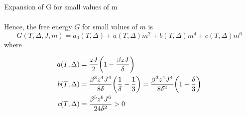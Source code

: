 \documentclass[../main/main.tex]{subfiles}
\begin{document}
\begin{exercise}{Expansion of G for small values of m }{}
\begin{solution}
\begin{equation*}
\begin{split}
\end{split}
\end{equation*}
Hence, the free energy \(G\) for small values of \(m\) is 
\begin{equation*}
  G (T, \Delta , J, m) = a_0 (T,\Delta ) + a(T, \Delta )m^2 + b (T, \Delta ) m^4 + c(T, \Delta )m^6
\end{equation*}
where
\begin{subequations*}
\begin{align*}
  a(T,\Delta ) &= \frac{z J}{2} \qty(1 - \frac{\beta z J}{\delta })   \\
  b(T,\Delta ) &= \frac{\beta ^3 z^4 J^4}{8 \delta } \qty(\frac{1}{\delta } - \frac{1}{3}) = \frac{\beta ^3 z^4 J^4}{8 \delta^2 } \qty(1 - \frac{\delta }{3})    \\
  c(T,\Delta ) &= \frac{\beta ^5 z^6 J^6}{24 \delta^2 } > 0
\end{align*}
\end{subequations*}
\end{solution}

\end{exercise}
\end{document}
